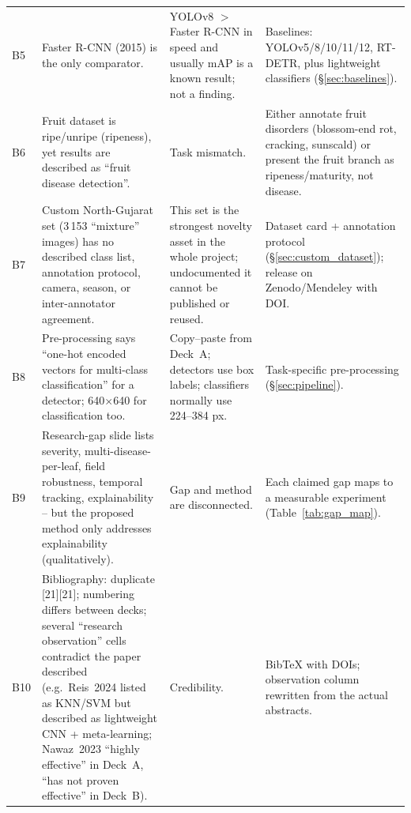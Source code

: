 \begin{longtable}{@{}L{0.5cm}L{5.2cm}L{5.4cm}L{5.0cm}@{}}
B5 & Faster R-CNN (2015) is the only comparator. & YOLOv8 $>$ Faster R-CNN in speed and usually mAP is a known result; not a finding. & Baselines: YOLOv5/8/10/11/12, RT-DETR, plus lightweight classifiers (\S\ref{sec:baselines}). \\
B6 & Fruit dataset is ripe/unripe (ripeness), yet results are described as ``fruit disease detection''. & Task mismatch. & Either annotate fruit disorders (blossom-end rot, cracking, sunscald) or present the fruit branch as ripeness/maturity, not disease. \\
B7 & Custom North-Gujarat set (3\,153 ``mixture'' images) has no described class list, annotation protocol, camera, season, or inter-annotator agreement. & This set is the strongest novelty asset in the whole project; undocumented it cannot be published or reused. & Dataset card + annotation protocol (\S\ref{sec:custom_dataset}); release on Zenodo/Mendeley with DOI. \\
B8 & Pre-processing says ``one-hot encoded vectors for multi-class classification'' for a detector; 640$\times$640 for classification too. & Copy--paste from Deck~A; detectors use box labels; classifiers normally use 224--384 px. & Task-specific pre-processing (\S\ref{sec:pipeline}). \\
B9 & Research-gap slide lists severity, multi-disease-per-leaf, field robustness, temporal tracking, explainability -- but the proposed method only addresses explainability (qualitatively). & Gap and method are disconnected. & Each claimed gap maps to a measurable experiment (Table~\ref{tab:gap_map}). \\
B10 & Bibliography: duplicate [21][21]; numbering differs between decks; several ``research observation'' cells contradict the paper described (e.g.\ Reis~2024 listed as KNN/SVM but described as lightweight CNN + meta-learning; Nawaz~2023 ``highly effective'' in Deck~A, ``has not proven effective'' in Deck~B). & Credibility. & BibTeX with DOIs; observation column rewritten from the actual abstracts. \\
\end{longtable}

